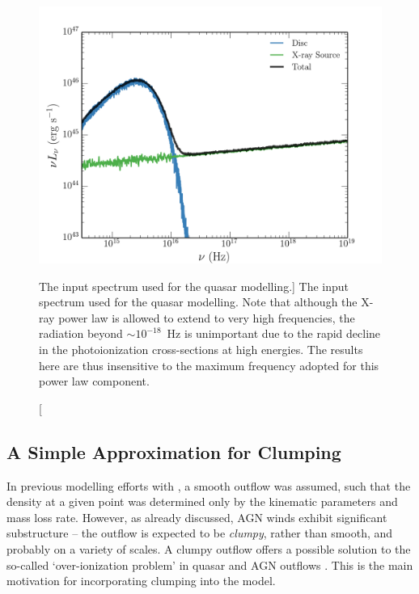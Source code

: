 \begin{figure} 
\centering
\includegraphics[width=1.0\textwidth]{figures/06-agnpaper/qso_model_sed.png}
\caption
[The input spectrum used for the quasar modelling.]
{
The input spectrum used for the quasar modelling. Note that
although the X-ray power law is allowed to extend to very 
high frequencies, the radiation beyond $\sim10^{-18}$~Hz is 
unimportant due to the rapid decline in the
photoionization cross-sections at high energies. 
The results here are thus insensitive
to the maximum frequency adopted for this power law component.
}
\label{fig:qso_model_sed}
\end{figure} 

\subsection{A Simple Approximation for Clumping}

In previous modelling efforts with \py, a smooth outflow was assumed, 
such that the density at a given point was determined only by the 
kinematic parameters and mass loss rate. However, as already discussed,
AGN winds exhibit significant substructure -- the outflow is expected to be
{\em clumpy}, rather than smooth, and probably on a variety of scales. 
A clumpy outflow offers a possible solution to the so-called `over-ionization problem' in 
quasar and AGN outflows \citep[e.g.][]{junk1983,weymann1985,hamann2013}. 
This is the main motivation for incorporating clumping into the model.

